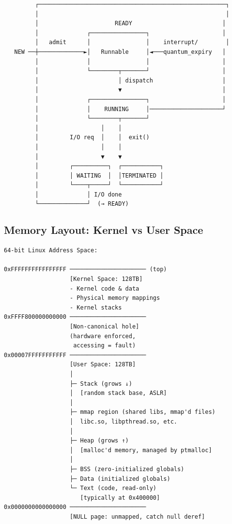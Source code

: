 \documentclass[11pt]{article}
\begin{document}
\begin{verbatim}
         ┌──────────────────────────────────────────────────────┐
         │                                                      │
         │                      READY                          │
         │              ┌────────────────┐                     │
         │   admit      │                │    interrupt/        │
   NEW ──┼─────────────►│   Runnable     │◄───quantum_expiry   │
         │              │                │                     │
         │              └────────┬───────┘                     │
         │                       │ dispatch                    │
         │                       ▼                             │
         │              ┌────────────────┐                     │
         │              │    RUNNING     │─────────────────────┘
         │              └────────┬───────┘
         │                  │    │
         │         I/O req  │    │  exit()
         │                  │    │
         │                  ▼    ▼
         │         ┌──────────┐  ┌───────────┐
         │         │ WAITING  │  │TERMINATED │
         │         └────┬─────┘  └───────────┘
         │              │ I/O done
         └──────────────┘  (→ READY)
\end{verbatim}

\subsection{Memory Layout: Kernel vs User Space}\label{memory-layout-kernel-vs-user-space}

\setcodelang{}

\begin{verbatim}
64-bit Linux Address Space:

0xFFFFFFFFFFFFFFFF ────────────────────── (top)
                   [Kernel Space: 128TB]
                   - Kernel code & data
                   - Physical memory mappings
                   - Kernel stacks
0xFFFF800000000000 ──────────────────────
                   [Non-canonical hole]
                   (hardware enforced,
                    accessing = fault)
0x00007FFFFFFFFFFF ──────────────────────
                   [User Space: 128TB]
                   │
                   ├─ Stack (grows ↓)
                   │  [random stack base, ASLR]
                   │
                   ├─ mmap region (shared libs, mmap'd files)
                   │  libc.so, libpthread.so, etc.
                   │
                   ├─ Heap (grows ↑)
                   │  [malloc'd memory, managed by ptmalloc]
                   │
                   ├─ BSS (zero-initialized globals)
                   ├─ Data (initialized globals)
                   └─ Text (code, read-only)
                      [typically at 0x400000]
0x0000000000000000 ──────────────────────
                   [NULL page: unmapped, catch null deref]
\end{verbatim}
\end{document}
